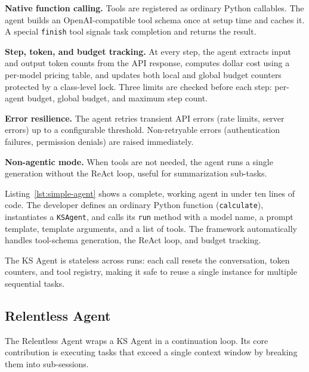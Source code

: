 \documentclass{article}
\begin{document}
\textbf{Native function calling.}  Tools are registered as ordinary Python callables.  The agent builds an OpenAI-compatible tool schema once at setup time and caches it.  A special \texttt{finish} tool signals task completion and returns the result.

\textbf{Step, token, and budget tracking.}  At every step, the agent extracts input and output token counts from the API response, computes dollar cost using a per-model pricing table, and updates both local and global budget counters protected by a class-level lock.  Three limits are checked before each step: per-agent budget, global budget, and maximum step count.

\textbf{Error resilience.}  The agent retries transient API errors (rate limits, server errors) up to a configurable threshold.  Non-retryable errors (authentication failures, permission denials) are raised immediately.

\textbf{Non-agentic mode.}  When tools are not needed, the agent runs a single generation without the ReAct loop, useful for summarization sub-tasks.

Listing~\ref{lst:simple-agent} shows a complete, working agent in under ten lines of code.  The developer defines an ordinary Python function (\texttt{calculate}), instantiates a \texttt{KSAgent}, and calls its \texttt{run} method with a model name, a prompt template, template arguments, and a list of tools.  The framework automatically handles tool-schema generation, the ReAct loop, and budget tracking.

The KS Agent is stateless across runs: each call resets the conversation, token counters, and tool registry, making it safe to reuse a single instance for multiple sequential tasks.

\subsection{Relentless Agent}
\label{sec:relentless-agent}

The Relentless Agent wraps a KS Agent in a continuation loop.  Its core contribution is executing tasks that exceed a single context window by breaking them into sub-sessions.
\end{document}
